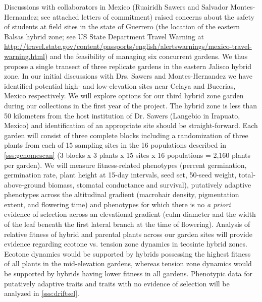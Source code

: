 Discussions with collaborators in Mexico (Ruairidh Sawers and Salvador Montes-Hernandez; see attached letters of commitment) raised concerns about the safety of students at field sites in the state of Guerrero (the location of the eastern Balsas hybrid zone; see US State Department Travel Warning at \url{http://travel.state.gov/content/passports/english/alertswarnings/mexico-travel-warning.html}) and the feasibility of managing six concurrent gardens. We thus propose a single transect of three replicate gardens in the eastern Jalisco hybrid zone. 
In our initial discussions with Drs. Sawers and Montes-Hernandez we have identified potential high- and low-elevation sites near Celaya and Bucerias, Mexico respectively.  
We will explore options for our third hybrid zone garden during our collections in the first year of the project.
The hybrid zone is less than 50 kilometers from the host institution of Dr. Sawers (Langebio in Irapuato, Mexico) and identification of an appropriate site should be straight-forward.
Each garden will consist of three complete blocks including a randomization of three plants from each of 15 sampling sites in the 16 populations described in \ref{sss:genomescan} (3 blocks x 3 plants x 15 sites x 16 populations = 2,160 plants per garden).  
We will measure fitness-related phenotypes (percent germination, germination rate, plant height at 15-day intervals, seed set, 50-seed weight, total-above-ground biomass, stomatal conductance and survival), putatively adaptive phenotypes across the altitudinal gradient (macrohair density, pigmentation extent, and flowering time) and phenotypes for which there is no \emph{a priori} evidence of selection across an elevational gradient (culm diameter and the width of the leaf beneath the first lateral branch at the time of flowering).  
Analysis of relative fitness of hybrid and parental plants across our garden sites will provide evidence regarding ecotone vs. tension zone dynamics in teosinte hybrid zones.  Ecotone dynamics would be supported by hybrids possessing the highest fitness of all plants in the mid-elevation gardens, whereas tension zone dynamics would be supported by hybrids having lower fitness in all gardens.  Phenotypic data for putatively adaptive traits and traits with no evidence of selection will be analyzed in \ref{sss:driftsel}. 
		
